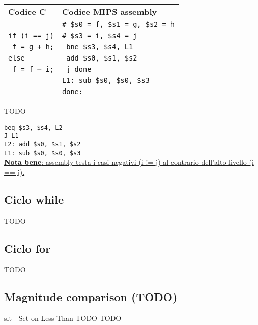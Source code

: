 \documentclass[../main.tex]{subfiles}
\begin{document}
\noindent
\begin{tabular}{ p{7cm} p{7cm} }
    \textbf{Codice C} & \textbf{Codice MIPS assembly} \\
    & \texttt{\# \$s0 = f, \$s1 = g, \$s2 = h} \\
	\texttt{if (i == j)} & \texttt{\# \$s3 = i, \$s4 = j} \\
    \texttt{ \hspace*{0cm} f = g + h;} & \texttt{ \hspace*{0cm} bne \$s3, \$s4, L1} \\
    \texttt{else} & \texttt{ \hspace*{0cm} add \$s0, \$s1, \$s2} \\
    \texttt{ \hspace*{0cm} f = f $–$ i;} & \texttt{ \hspace*{0cm} j done} \\
    & \texttt{L1: sub \$s0, \$s0, \$s3} \\
    & \texttt{done:} \\
\end{tabular}

\noindent
TODO

\noindent
\texttt{beq \$s3, \$s4, L2} \\
\texttt{J L1} \\
\texttt{L2: add \$s0, \$s1, \$s2} \\
\texttt{L1: sub \$s0, \$s0, \$s3} \\

\noindent
\underline{\textbf{Nota bene}: assembly testa i casi negativi (i != j)
al contrario dell'alto livello (i == j).}

\subsection{Ciclo while}
TODO

\subsection{Ciclo for}
TODO

\subsection{Magnitude comparison (TODO)}
slt - Set on Less Than
TODO
TODO
\end{document}
